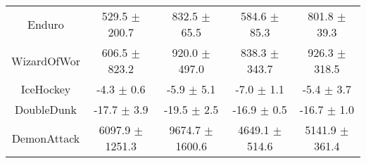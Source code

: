 \begin{table}[H]
{\begin{tabular}{ccccc}
Enduro        &     529.5 $\pm$ 200.7 &      832.5 $\pm$ 65.5 &     584.6 $\pm$ 85.3 &      801.8 $\pm$ 39.3 \\
WizardOfWor   &     606.5 $\pm$ 823.2 &     920.0 $\pm$ 497.0 &    838.3 $\pm$ 343.7 &     926.3 $\pm$ 318.5 \\
IceHockey     &        -4.3 $\pm$ 0.6 &        -5.9 $\pm$ 5.1 &       -7.0 $\pm$ 1.1 &        -5.4 $\pm$ 3.7 \\
DoubleDunk    &       -17.7 $\pm$ 3.9 &       -19.5 $\pm$ 2.5 &      -16.9 $\pm$ 0.5 &       -16.7 $\pm$ 1.0 \\
DemonAttack   &   6097.9 $\pm$ 1251.3 &   9674.7 $\pm$ 1600.6 &   4649.1 $\pm$ 514.6 &    5141.9 $\pm$ 361.4 \\
\bottomrule
\end{tabular}}
\end{table}




